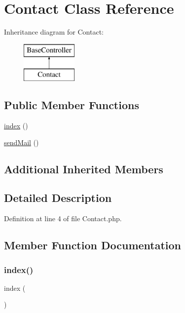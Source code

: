 \hypertarget{class_contact}{}\section{Contact Class Reference}
\label{class_contact}
Inheritance diagram for Contact\+:\begin{figure}[H]
\begin{center}
\leavevmode
\includegraphics[height=2.000000cm]{class_contact}
\end{center}
\end{figure}
\subsection*{Public Member Functions}
\begin{DoxyCompactItemize}
\item 
\hyperlink{class_contact_a149eb92716c1084a935e04a8d95f7347}{index} ()
\item 
\hyperlink{class_contact_a1f753d67be418d065282360fc5231d05}{send\+Mail} ()
\end{DoxyCompactItemize}
\subsection*{Additional Inherited Members}


\subsection{Detailed Description}


Definition at line 4 of file Contact.\+php.



\subsection{Member Function Documentation}
\hypertarget{class_contact_a149eb92716c1084a935e04a8d95f7347}{}\label{class_contact_a149eb92716c1084a935e04a8d95f7347} 
\subsubsection{\texorpdfstring{index()}{index()}}
{\footnotesize\ttfamily index (\begin{DoxyParamCaption}{ }\end{DoxyParamCaption})}




